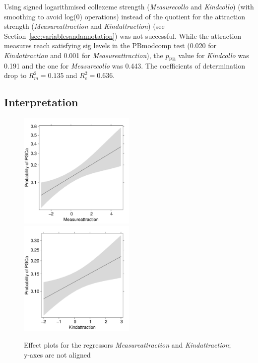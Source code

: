 Using signed logarithmised collexeme strength (\textit{Measurecollo} and \textit{Kindcollo}) (with smoothing to avoid log(0) operations) instead of the quotient for the attraction strength (\textit{Measureattraction} and \textit{Kindattraction}) (see Section~\ref{sec:variablesandannotation}) was not successful.
While the attraction measures reach satisfying sig levels in the PBmodcomp test (0.020 for \textit{Kindattraction} and 0.001 for \textit{Measureattraction}), the $p_{\text{PB}}$ value for \textit{Kindcollo} was 0.191 and the one for \textit{Measurecollo} was 0.443.
The coefficients of determination drop to $R_m^2=0.135$ and $R^2_c=0.636$.


\subsection{Interpretation}
\label{sec:interpretation}





\begin{figure}[h!]
  \centering
  \includegraphics[width=0.5\textwidth]{../R/output/corpus_Measureattraction}~\includegraphics[width=0.5\textwidth]{../R/output/corpus_Kindattraction}
  \caption{Effect plots for the regressors \textit{Measureattraction} and \textit{Kindattraction}; y-axes are not aligned}
  \label{fig:eff:attraction}
\end{figure}

